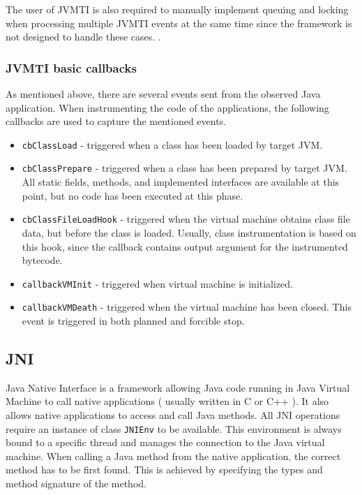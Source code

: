 The user of JVMTI is also required to manually implement queuing and locking when processing multiple JVMTI events at the same time since the framework is not designed to handle these cases. \cite{JVMTI_Callbacks}.
\subsubsection{JVMTI basic callbacks}
As mentioned above, there are several events sent from the observed Java application. When instrumenting the code of the applications, the following callbacks are used to capture the mentioned events.
\begin{itemize}
	\item \texttt{cbClassLoad} - triggered when a class has been loaded by target JVM.
	\item \texttt{cbClassPrepare} - triggered when a class has been prepared by target JVM. All static fields, methods, and implemented interfaces are available at this point, but no code has been executed at this phase.
	\item \texttt{cbClassFileLoadHook} - triggered when the virtual machine obtains class file data, but before the class is loaded. Usually, class instrumentation is based on this hook, since the callback contains output argument for the instrumented bytecode.
	\item  \texttt{callbackVMInit} - triggered when virtual machine is initialized.
	\item  \texttt{callbackVMDeath} - triggered when the virtual machine has been closed. This event is triggered in both planned and forcible stop.
\end{itemize}

\subsection{JNI}
\label{JNI}
Java Native Interface is a framework allowing Java code running in Java Virtual Machine to call native applications ( usually written in C or C++ ). It also allows native applications to access and call Java methods. All JNI operations require an instance of class \texttt{JNIEnv} to be available. This environment is always bound to a specific thread and manages the connection to the Java virtual machine. When calling a Java method from the native application, the correct method has to be first found. This is achieved by specifying the types and method signature of the method.
